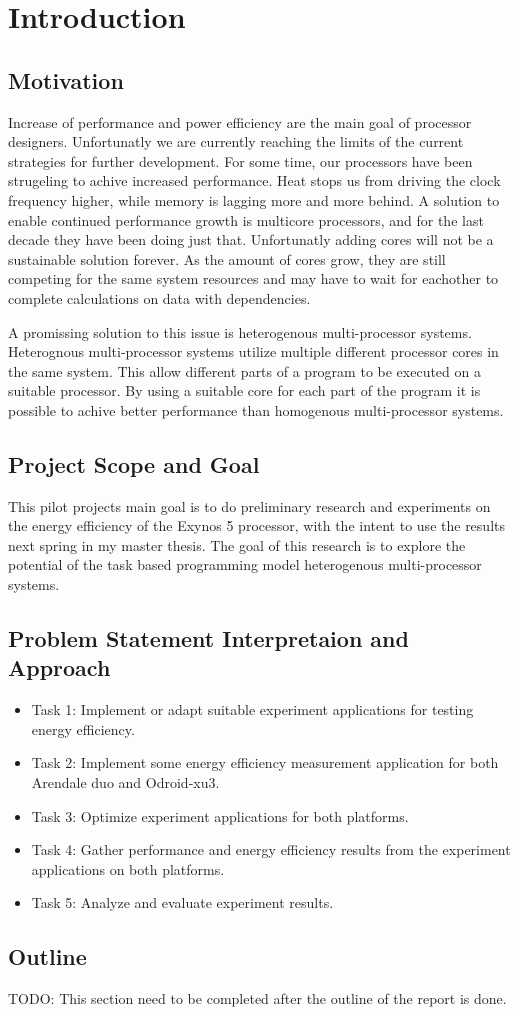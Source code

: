 \chapter[Introduction]{Introduction}
\section{Motivation}
Increase of performance and power efficiency are the main goal of processor designers.
Unfortunatly we are currently reaching the limits of the current strategies for further development.
For some time, our processors have been strugeling to achive increased performance.
Heat stops us from driving the clock frequency higher, while memory is lagging more and more behind.
A solution to enable continued performance growth is multicore processors, and for the last decade they have been doing just that.
Unfortunatly adding cores will not be a sustainable solution forever.
As the amount of cores grow, they are still competing for the same system resources and may have to wait for eachother to complete calculations on data with dependencies.

A promissing solution to this issue is heterogenous multi-processor systems.
Heterognous multi-processor systems utilize multiple different processor cores in the same system.
This allow different parts of a program to be executed on a suitable processor.
By using a suitable core for each part of the program it is possible to achive better performance than homogenous multi-processor systems.

\section{Project Scope and Goal}
This pilot projects main goal is to do preliminary research and experiments on the energy efficiency of the Exynos 5 processor, with the intent to use the results next spring in my master thesis.
The goal of this research is to explore the potential of the task based programming model heterogenous multi-processor systems.

\section{Problem Statement Interpretaion and Approach}
\begin{itemize}
  \item Task 1: Implement or adapt suitable experiment applications for testing energy efficiency.
  \item Task 2: Implement some energy efficiency measurement application for both Arendale duo and Odroid-xu3.
  \item Task 3: Optimize experiment applications for both platforms.
  \item Task 4: Gather performance and energy efficiency results from the experiment applications on both platforms.
  \item Task 5: Analyze and evaluate experiment results.
\end{itemize}
\section{Outline}
TODO: This section need to be completed after the outline of the report is done.
